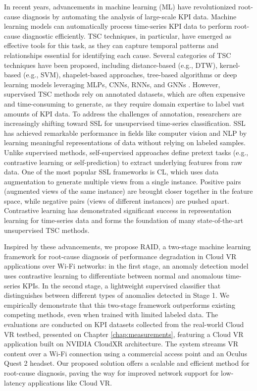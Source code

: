 In recent years, advancements in machine learning (ML) have revolutionized root-cause diagnosis by automating the analysis of large-scale KPI data. Machine learning models can automatically process time-series KPI data to perform root-cause diagnostic efficiently. \ac{TSC} techniques, in particular, have emerged as effective tools for this task, as they can capture temporal patterns and relationships essential for identifying each cause. Several categories of TSC techniques have been proposed, including distance-based (e.g., DTW), kernel-based (e.g., SVM), shapelet-based approaches, tree-based algorithms or deep learning models leveraging MLPs, CNNs, RNNs, and GNNs \cite{ismail2019deep, faouzi2022time,mohammadi2024deep}. However, supervised TSC methods rely on annotated datasets, which are often expensive and time-consuming to generate, as they require domain expertise to label vast amounts of KPI data. To address the challenges of annotation, researchers are increasingly shifting toward \ac{SSL} for unsupervised time-series classification. SSL has achieved remarkable performance in fields like computer vision and \ac{NLP} by learning meaningful representations of data without relying on labeled samples. Unlike supervised methods, self-supervised approaches define pretext tasks (e.g., contrastive learning or self-prediction) to extract underlying features from raw data. One of the most popular SSL frameworks is \ac{CL}, which uses data augmentation to generate multiple views from a single instance. Positive pairs (augmented views of the same instance) are brought closer together in the feature space, while negative pairs (views of different instances) are pushed apart. Contrastive learning has demonstrated significant success in representation learning for time-series data and forms the foundation of many state-of-the-art unsupervised TSC methods.  

Inspired by these advancements, we propose \ac{RAID}, a two-stage machine learning framework for root-cause diagnosis of performance degradation in Cloud VR applications over Wi-Fi networks: in the first stage, an anomaly detection model uses contrastive learning to differentiate between normal and anomalous time-series KPIs. In the second stage, a lightweight supervised classifier that distinguishes between different types of anomalies detected in Stage 1. We empirically demonstrate that this two-stage framework outperforms existing competing methods, even when trained with limited labeled data. The evaluations are conducted on KPI datasets collected from the real-world Cloud VR testbed, presented on Chapter \ref{chap:measurements}, featuring a Cloud VR application built on NVIDIA CloudXR architecture. The system streams VR content over a Wi-Fi connection using a commercial access point and an Oculus Quest 2 headset. Our proposed solution offers a scalable and efficient method for root-cause diagnosis, paving the way for improved network support for low-latency applications like Cloud VR.  

